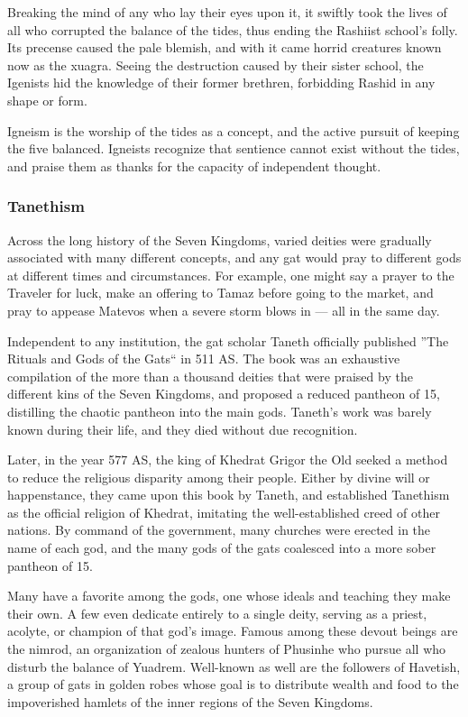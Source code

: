 Breaking the mind of any who lay their eyes upon it, it swiftly took the lives of all who corrupted the balance of the tides, thus ending the Rashiist school's folly.
Its precense caused the pale blemish, and with it came horrid creatures known now as the xuagra.
Seeing the destruction caused by their sister school, the Igenists hid the knowledge of their former brethren, forbidding Rashid in any shape or form.

Igneism is the worship of the tides as a concept, and the active pursuit of keeping the five balanced.
Igneists recognize that sentience cannot exist without the tides, and praise them as thanks for the capacity of independent thought.

\subsubsection{Tanethism}
Across the long history of the Seven Kingdoms, varied deities were gradually associated with many different concepts, and any gat would pray to different gods at different times and circumstances.
For example, one might say a prayer to the Traveler for luck, make an offering to Tamaz before going to the market, and pray to appease Matevos when a severe storm blows in --- all in the same day.

Independent to any institution, the gat scholar Taneth officially published ''The Rituals and Gods of the Gats`` in 511 AS.
The book was an exhaustive compilation of the more than a thousand deities that were praised by the different kins of the Seven Kingdoms, and proposed a reduced pantheon of 15, distilling the chaotic pantheon into the main gods.
Taneth's work was barely known during their life, and they died without due recognition.

Later, in the year 577 AS, the king of Khedrat Grigor the Old seeked a method to reduce the religious disparity among their people.
Either by divine will or happenstance, they came upon this book by Taneth, and established Tanethism as the official religion of Khedrat, imitating the well-established creed of other nations.
By command of the government, many churches were erected in the name of each god, and the many gods of the gats coalesced into a more sober pantheon of 15.

Many have a favorite among the gods, one whose ideals and teaching they make their own.
A few even dedicate entirely to a single deity, serving as a priest, acolyte, or champion of that god's image.
Famous among these devout beings are the nimrod, an organization of zealous hunters of Phusinhe who pursue all who disturb the balance of Yuadrem.
Well-known as well are the followers of Havetish, a group of gats in golden robes whose goal is to distribute wealth and food to the impoverished hamlets of the inner regions of the Seven Kingdoms.

